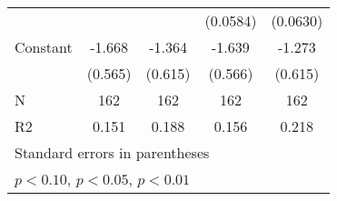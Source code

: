 {\begin{tabular}{l*{4}{c}}
                    &                     &                     &    (0.0584)         &    (0.0630)         \\
[1em]
Constant            &      -1.668\sym{***}&      -1.364\sym{**} &      -1.639\sym{***}&      -1.273\sym{**} \\
                    &     (0.565)         &     (0.615)         &     (0.566)         &     (0.615)         \\
\hline
N                   &         162         &         162         &         162         &         162         \\
R2                  &       0.151         &       0.188         &       0.156         &       0.218         \\
\hline\hline
\multicolumn{5}{l}{\footnotesize Standard errors in parentheses}\\
\multicolumn{5}{l}{\footnotesize \sym{*} \(p<0.10\), \sym{**} \(p<0.05\), \sym{***} \(p<0.01\)}\\
\end{tabular}
}
